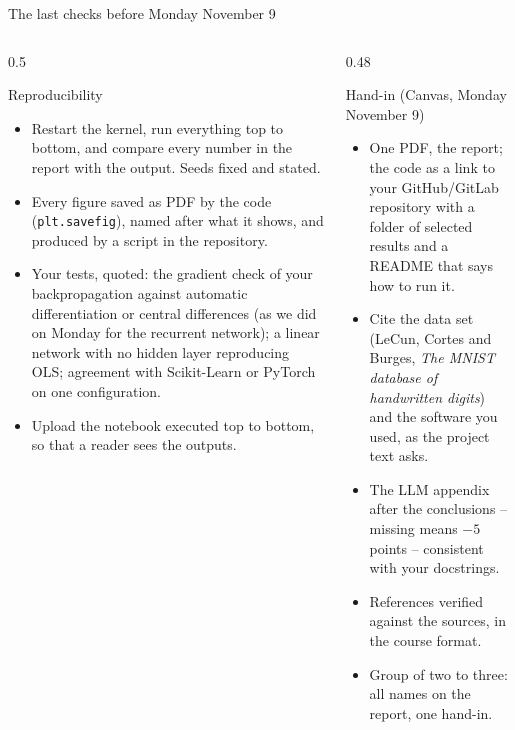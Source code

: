 \documentclass[10pt,aspectratio=169]{beamer}
\begin{document}
\begin{frame}{The last checks before Monday November 9}
\scriptsize
\begin{columns}[T]
\begin{column}{0.5\textwidth}
\begin{block}{Reproducibility}
\begin{itemize}
  \item Restart the kernel, run everything top to bottom, and compare every
        number in the report with the output.  Seeds fixed and stated.
  \item Every figure saved as PDF by the code (\texttt{plt.savefig}), named
        after what it shows, and produced by a script in the repository.
  \item Your tests, quoted: the gradient check of your backpropagation
        against automatic differentiation or central differences (as we did
        on Monday for the recurrent network); a linear network with no hidden
        layer reproducing OLS; agreement with Scikit-Learn or PyTorch on one
        configuration.
  \item Upload the notebook executed top to bottom, so that a reader sees
        the outputs.
\end{itemize}
\end{block}
\end{column}
\begin{column}{0.48\textwidth}
\begin{block}{Hand-in (Canvas, Monday November 9)}
\begin{itemize}
  \item One PDF, the report; the code as a link to your GitHub/GitLab
        repository with a folder of selected results and a README that says
        how to run it.
  \item Cite the data set (LeCun, Cortes and Burges, \emph{The MNIST database
        of handwritten digits}) and the software you used, as the project
        text asks.
  \item The LLM appendix after the conclusions -- missing means $-5$ points
        -- consistent with your docstrings.
  \item References verified against the sources, in the course format.
  \item Group of two to three: all names on the report, one hand-in.
\end{itemize}
\end{block}
\end{column}
\end{columns}
\end{frame}
\end{document}
